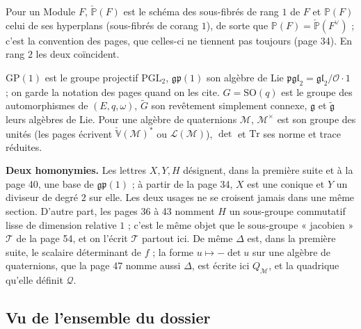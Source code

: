 \documentclass[11pt,a4paper]{article}
\begin{document}
Pour un Module $F$, $\check{\mathbb{P}}(F)$ est le schéma des sous-fibrés de rang $1$
de $F$ et $\mathbb{P}(F)$ celui de ses hyperplans (sous-fibrés de corang $1$),
de sorte que $\mathbb{P}(F) = \check{\mathbb{P}}(F^{\vee})$ ; c'est la convention des
pages, que celles-ci ne tiennent pas toujours (page 34). En rang $2$ les deux
coïncident.

$\mathrm{GP}(1)$ est le groupe projectif $\mathrm{PGL}_2$, $\mathfrak{gp}(1)$ son
algèbre de Lie $\mathfrak{pgl}_2 = \mathfrak{gl}_2/\mathcal{O}\cdot 1$ ; on garde la
notation des pages quand on les cite. $G = \mathrm{SO}(q)$ est le groupe des
automorphismes de $(E, q, \omega)$, $\widetilde{G}$ son revêtement simplement connexe,
$\mathfrak{g}$ et $\widetilde{\mathfrak{g}}$ leurs algèbres de Lie. Pour une algèbre de
quaternions $\mathcal{M}$, $\mathcal{M}^{\times}$ est son groupe des unités (les pages
écrivent $\check{\mathbb{V}}(\mathcal{M})^{*}$ ou $\mathcal{L}(\mathcal{M})$), $\det$ et
$\mathrm{Tr}$ ses norme et trace réduites.

\textbf{Deux homonymies.} Les lettres $X, Y, H$ désignent, dans la première
suite et à la page 40, une base de $\mathfrak{gp}(1)$ ; à partir de la page 34, $X$
est une conique et $Y$ un diviseur de degré $2$ sur elle. Les deux usages ne se
croisent jamais dans une même section. D'autre part, les pages 36 à 43 nomment
$H$ un sous-groupe commutatif lisse de dimension relative $1$ ; c'est le même
objet que le sous-groupe « jacobien » $\mathcal{T}$ de la page 54, et on l'écrit
$\mathcal{T}$ partout ici. De même $\Delta$ est, dans la première suite, le scalaire
déterminant de $f$ ; la forme $u \mapsto -\det u$ sur une algèbre de quaternions,
que la page 47 nomme aussi $\Delta$, est écrite ici $Q_{\mathcal{M}}$, et la quadrique
qu'elle définit $\mathcal{Q}$.

\subsection*{Vu de l'ensemble du dossier}
\end{document}
